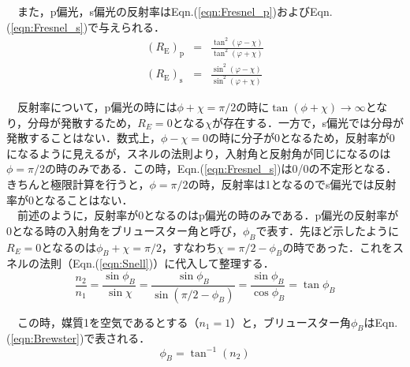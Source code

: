 　また，p偏光，s偏光の反射率はEqn.(\ref{eqn:Fresnel_p})およびEqn.(\ref{eqn:Fresnel_s})で与えられる．
\begin{eqnarray}
    \left(R_{\mathrm{E}}\right)_{\mathrm{p}}&=&\frac{\tan ^{2}(\varphi-\chi)}{\tan ^{2}(\varphi+\chi)}
    \label{eqn:Fresnel_p} \\
    \left(R_{\mathrm{E}}\right)_{\mathrm{s}}&=&\frac{\sin ^{2}(\varphi-\chi)}{\sin ^{2}(\varphi+\chi)}
    \label{eqn:Fresnel_s}
\end{eqnarray}


　反射率について，p偏光の時には$\phi+\chi=\pi/2$の時に$\tan(\phi+\chi)\rightarrow\infty$となり，分母が発散するため，$R_E = 0$となる$\chi$が存在する．一方で，s偏光では分母が発散することはない．数式上，$\phi-\chi=0$の時に分子が0となるため，反射率が0になるように見えるが，スネルの法則より，入射角と反射角が同じになるのは$\phi = \pi/2$の時のみである．この時，Eqn.(\ref{eqn:Fresnel_s})は0/0の不定形となる．きちんと極限計算を行うと，$\phi = \pi/2$の時，反射率は1となるのでs偏光では反射率が0となることはない．\\

　前述のように，反射率が0となるのはp偏光の時のみである．p偏光の反射率が0となる時の入射角をブリュースター角と呼び，$\phi_B$で表す．先ほど示したように$R_E = 0$となるのは$\phi_B+\chi=\pi/2$，すなわち$\chi=\pi/2-\phi_B$の時であった．これをスネルの法則（Eqn.(\ref{eqn:Snell})）に代入して整理する．
\begin{equation}
    \frac{n_2}{n_1} = \frac{\sin \phi_B}{\sin \chi} = \frac{\sin \phi_B}{\sin (\pi/2-\phi_B)} = \frac{\sin \phi_B}{\cos \phi_B} = \tan \phi_B
\end{equation}

　この時，媒質1を空気であるとする（$n_1 = 1$）と，ブリュースター角$\phi_B$はEqn.(\ref{eqn:Brewster})で表される．
\begin{equation}
    \phi_B = \tan^{-1} (n_2)
    \label{eqn:Brewster}
\end{equation}

